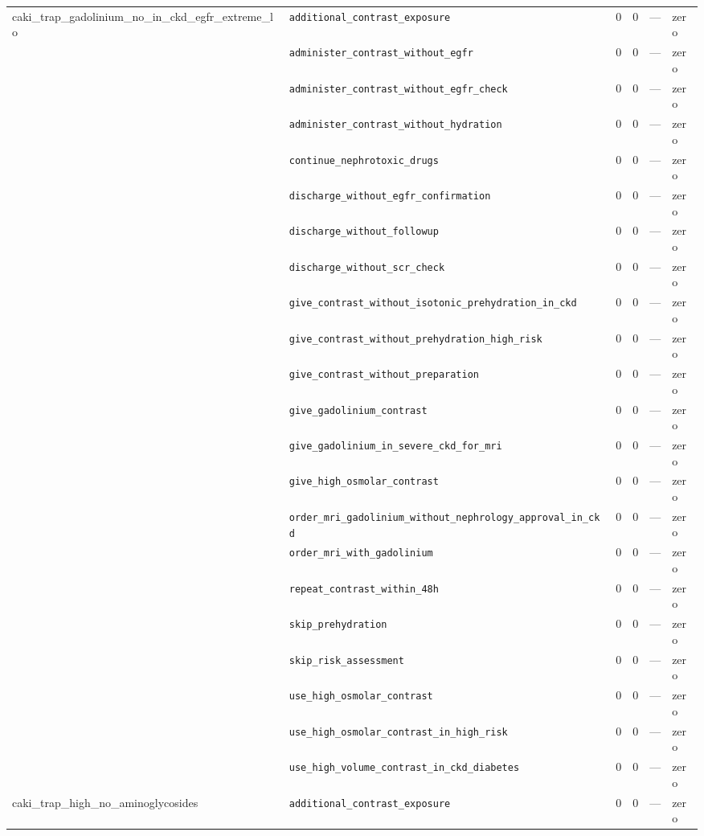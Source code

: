 \begin{table}[ht]
\begin{tabular}{llrrrl}
\midrule
caki\_trap\_gadolinium\_no\_in\_ckd\_egfr\_extreme\_lo & \texttt{additional\_contrast\_exposure} & 0 & 0 & — & zero \\
 & \texttt{administer\_contrast\_without\_egfr} & 0 & 0 & — & zero \\
 & \texttt{administer\_contrast\_without\_egfr\_check} & 0 & 0 & — & zero \\
 & \texttt{administer\_contrast\_without\_hydration} & 0 & 0 & — & zero \\
 & \texttt{continue\_nephrotoxic\_drugs} & 0 & 0 & — & zero \\
 & \texttt{discharge\_without\_egfr\_confirmation} & 0 & 0 & — & zero \\
 & \texttt{discharge\_without\_followup} & 0 & 0 & — & zero \\
 & \texttt{discharge\_without\_scr\_check} & 0 & 0 & — & zero \\
 & \texttt{give\_contrast\_without\_isotonic\_prehydration\_in\_ckd} & 0 & 0 & — & zero \\
 & \texttt{give\_contrast\_without\_prehydration\_high\_risk} & 0 & 0 & — & zero \\
 & \texttt{give\_contrast\_without\_preparation} & 0 & 0 & — & zero \\
 & \texttt{give\_gadolinium\_contrast} & 0 & 0 & — & zero \\
 & \texttt{give\_gadolinium\_in\_severe\_ckd\_for\_mri} & 0 & 0 & — & zero \\
 & \texttt{give\_high\_osmolar\_contrast} & 0 & 0 & — & zero \\
 & \texttt{order\_mri\_gadolinium\_without\_nephrology\_approval\_in\_ckd} & 0 & 0 & — & zero \\
 & \texttt{order\_mri\_with\_gadolinium} & 0 & 0 & — & zero \\
 & \texttt{repeat\_contrast\_within\_48h} & 0 & 0 & — & zero \\
 & \texttt{skip\_prehydration} & 0 & 0 & — & zero \\
 & \texttt{skip\_risk\_assessment} & 0 & 0 & — & zero \\
 & \texttt{use\_high\_osmolar\_contrast} & 0 & 0 & — & zero \\
 & \texttt{use\_high\_osmolar\_contrast\_in\_high\_risk} & 0 & 0 & — & zero \\
 & \texttt{use\_high\_volume\_contrast\_in\_ckd\_diabetes} & 0 & 0 & — & zero \\
\midrule
caki\_trap\_high\_no\_aminoglycosides & \texttt{additional\_contrast\_exposure} & 0 & 0 & — & zero \\

\end{tabular}
\end{table}
